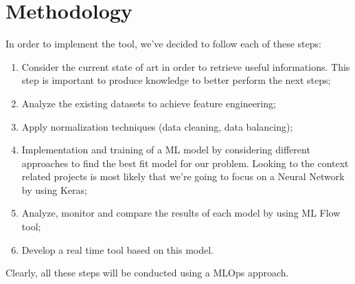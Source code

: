 \documentclass[sigconf]{acmart}
\begin{document}
\section{Methodology}
In order to implement the tool, we've decided to follow each of these steps:
\begin{enumerate}
\item Consider the current state of art in order to retrieve useful informations. This step is important to produce knowledge to better perform the next steps;
\item Analyze the existing datasets to achieve feature engineering;
\item Apply normalization techniques (data cleaning, data balancing);
\item Implementation and training of a ML model by considering different approaches to find the best fit model for our problem. Looking to the context related projects is most likely that we're going to focus on a Neural Network by using Keras;
\item Analyze, monitor and compare the results of each model by using ML Flow tool;
\item Develop a real time tool based on this model.
\end{enumerate}
Clearly, all these steps will be conducted using a MLOps approach.

    
    
\end{document}
